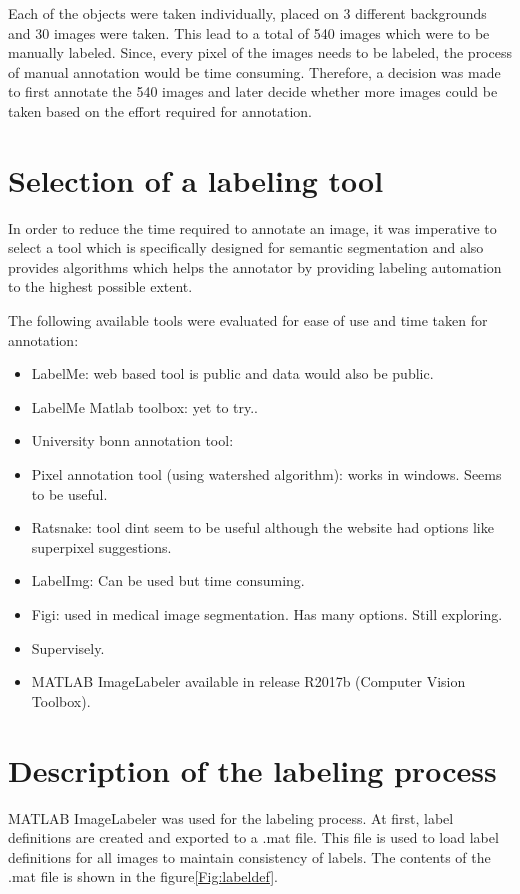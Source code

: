 Each of the objects were taken individually, placed on 3 different backgrounds and 30 images were taken. This lead to a total of 540 images which were to be manually labeled. Since, every pixel of the images needs to be labeled, the process of manual annotation would be time consuming. Therefore, a decision was made to first annotate the 540 images and later decide whether more images could be taken based on the effort required for annotation.

\section{Selection of a labeling tool}
In order to reduce the time required to annotate an image, it was imperative to select a tool which is specifically designed for semantic segmentation and also provides algorithms which helps the annotator by providing labeling automation to the highest possible extent.

The following available tools were evaluated for ease of use and time taken for annotation:
	\begin{itemize}
		\item LabelMe: web based tool is public and data would also be public.
		\item LabelMe Matlab toolbox: yet to try..
		\item University bonn annotation tool:
		\item Pixel annotation tool (using watershed algorithm): works in windows. Seems to be useful.
		\item Ratsnake: tool dint seem to be useful although the website had options like superpixel suggestions.
		\item LabelImg: Can be used but time consuming.
		\item Figi: used in medical image segmentation. Has many options. Still exploring.
		\item Supervisely.
		\item MATLAB ImageLabeler available in release R2017b (Computer Vision Toolbox).
	\end{itemize}

\section{Description of the labeling process}
\label{section:process}
MATLAB ImageLabeler was used for the labeling process. At first, label definitions are created and exported to a .mat file. This file is used to load label definitions for all images to maintain consistency of labels. The contents of the .mat file is shown in the figure\ref{Fig:labeldef}.

